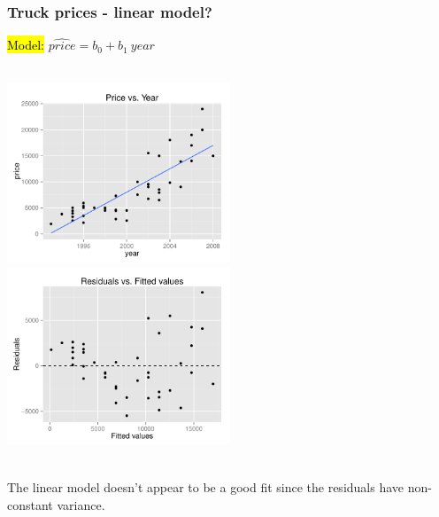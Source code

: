 \documentclass[11pt,containsverbatim,handout,xcolor=xelatex,dvipsnames,table]{beamer}
\begin{document}

\begin{frame}
\frametitle{Truck prices - linear model?}

\hl{Model:}  $\widehat{price} = b_0 + b_1~year$

$\:$ \\

\includegraphics[width=0.5\textwidth]{figures/pickup/pu_price_year_scat} 
\includegraphics[width=0.5\textwidth]{figures/pickup/pu_price_year_res}

\pause

$\:$ \\

The linear model doesn't appear to be a good fit since the residuals have non-constant variance.


\end{frame}

\end{document}
